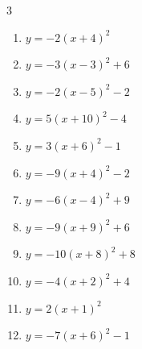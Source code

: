 \begin{multicols}{3}
\begin{enumerate}
  \item $\displaystyle y=-2\left( x+4\right)^{2}$

        \phantom{$\displaystyle 頂点\left( -4 , 0 \right)$}

  \item $\displaystyle y=-3\left( x-3\right)^{2}+6$

        \phantom{$\displaystyle 頂点\left( 3 , 6 \right)$}

  \item $\displaystyle y=-2\left( x-5\right)^{2}-2$

        \phantom{$\displaystyle 頂点\left( 5 , -2 \right)$}

  \item $\displaystyle y=5\left( x+10\right)^{2}-4$

        \phantom{$\displaystyle 頂点\left( -10 , -4 \right)$}

  \item $\displaystyle y=3\left( x+6\right)^{2}-1$

        \phantom{$\displaystyle 頂点\left( -6 , -1 \right)$}

  \item $\displaystyle y=-9\left( x+4\right)^{2}-2$

        \phantom{$\displaystyle 頂点\left( -4 , -2 \right)$}

  \item $\displaystyle y=-6\left( x-4\right)^{2}+9$

        \phantom{$\displaystyle 頂点\left( 4 , 9 \right)$}

  \item $\displaystyle y=-9\left( x+9\right)^{2}+6$

        \phantom{$\displaystyle 頂点\left( -9 , 6 \right)$}

  \item $\displaystyle y=-10\left( x+8\right)^{2}+8$

        \phantom{$\displaystyle 頂点\left( -8 , 8 \right)$}

  \item $\displaystyle y=-4\left( x+2\right)^{2}+4$

        \phantom{$\displaystyle 頂点\left( -2 , 4 \right)$}

  \item $\displaystyle y=2\left( x+1\right)^{2}$

        \phantom{$\displaystyle 頂点\left( -1 , 0 \right)$}

  \item $\displaystyle y=-7\left( x+6\right)^{2}-1$


\end{enumerate}
\end{multicols}
